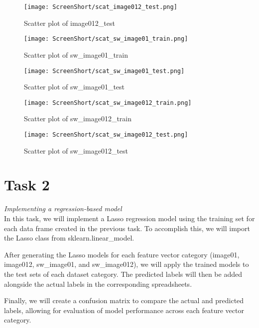 \documentclass[conference,12pt]{IEEEtran}
\begin{document}
\begin{figure}[h!]
    \centering
    \texttt{[image: ScreenShort/scat\_image012\_test.png]}
    \caption{Scatter plot of image012\_test}
\end{figure}

\begin{figure}[h!]
    \centering
    \texttt{[image: ScreenShort/scat\_sw\_image01\_train.png]}
    \caption{Scatter plot of sw\_image01\_train}
\end{figure}

\begin{figure}[h!]
    \centering
    \texttt{[image: ScreenShort/scat\_sw\_image01\_test.png]}
    \caption{Scatter plot of sw\_image01\_test}
\end{figure}

\begin{figure}[h!]
    \centering
    \texttt{[image: ScreenShort/scat\_sw\_image012\_train.png]}
    \caption{Scatter plot of sw\_image012\_train}
\end{figure}

\begin{figure}[h!]
    \centering
    \texttt{[image: ScreenShort/scat\_sw\_image012\_test.png]}
    \caption{Scatter plot of sw\_image012\_test}
\end{figure}

\section{Task 2}
\textit{Implementing a regression-based model}\\

In this task, we will implement a Lasso regression model using the training set for each data frame created in the previous task. To accomplish this, we will import the Lasso class from sklearn.linear\_model.

After generating the Lasso models for each feature vector category (image01, image012, sw\_image01, and sw\_image012), we will apply the trained models to the test sets of each dataset category. The predicted labels will then be added alongside the actual labels in the corresponding spreadsheets.

Finally, we will create a confusion matrix to compare the actual and predicted labels, allowing for evaluation of model performance across each feature vector category.
\end{document}
